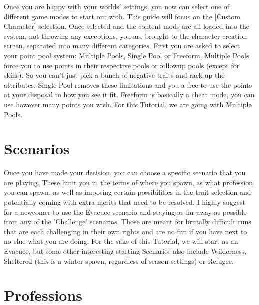 \documentclass[11pt]{report}
\begin{document}
Once you are happy with your worlds' settings, you now can select one of different game modes to start out with. This guide will focus on the [Custom Character] selection. Once selected and the content mods are all loaded into the system, not throwing any exceptions, you are brought to the character creation screen, separated into many different categories. First you are asked to select your point pool system: Multiple Pools, Single Pool or Freeform. Multiple Pools force you to use points in their respective pools or followup pools (except for skills). So you can't just pick a bunch of negative traits and rack up the attributes. Single Pool removes these limitations and you a free to use the points at your disposal to how you see it fit. Freeform is basically a cheat mode, you can use however many points you wish. For this Tutorial, we are going with Multiple Pools.


\section{Scenarios}

Once you have made your decision, you can choose a specific scenario that you are playing. These limit you in the terms of where you spawn, as what profession you can spawn, as well as imposing certain possibilities in the trait selection and potentially coming with extra merits that need to be resolved.
I highly suggest for a newcomer to use the Evacuee scenario and staying as far away as possible from any of the 'Challenge' scenarios. Those are meant for brutally difficult runs that are each challenging in their own rights and are no fun if you have next to no clue what you are doing. For the sake of this Tutorial, we will start as an Evacuee, but some other interesting starting Scenarios also include Wilderness, Sheltered (this is a winter spawn, regardless of season settings) or Refugee.

\section{Professions}
\end{document}
